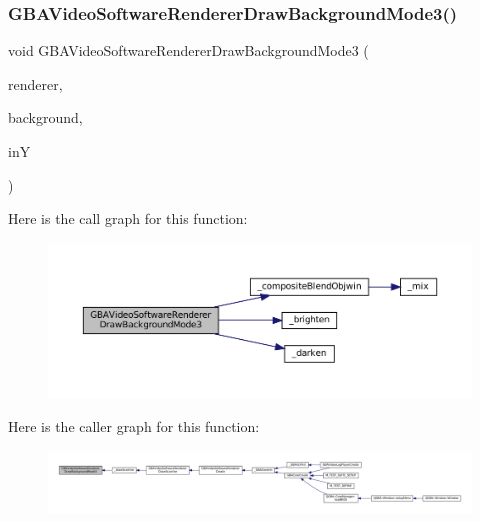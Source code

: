 \subsubsection{\texorpdfstring{G\+B\+A\+Video\+Software\+Renderer\+Draw\+Background\+Mode3()}{GBAVideoSoftwareRendererDrawBackgroundMode3()}}
{\footnotesize\ttfamily void G\+B\+A\+Video\+Software\+Renderer\+Draw\+Background\+Mode3 (\begin{DoxyParamCaption}\item[{struct G\+B\+A\+Video\+Software\+Renderer $\ast$}]{renderer,  }\item[{struct G\+B\+A\+Video\+Software\+Background $\ast$}]{background,  }\item[{\mbox{\hyperlink{ioapi_8h_a787fa3cf048117ba7123753c1e74fcd6}{int}}}]{inY }\end{DoxyParamCaption})}

Here is the call graph for this function\+:
\nopagebreak
\begin{figure}[H]
\begin{center}
\leavevmode
\includegraphics[width=350pt]{software-bg_8c_acbe6dcdc03c214a314aeaaca61d44be6_cgraph}
\end{center}
\end{figure}
Here is the caller graph for this function\+:
\nopagebreak
\begin{figure}[H]
\begin{center}
\leavevmode
\includegraphics[width=350pt]{software-bg_8c_acbe6dcdc03c214a314aeaaca61d44be6_icgraph}
\end{center}
\end{figure}
\mbox{\label{software-bg_8c_a405f08b46da4ca30878baab466bd2175}} 
